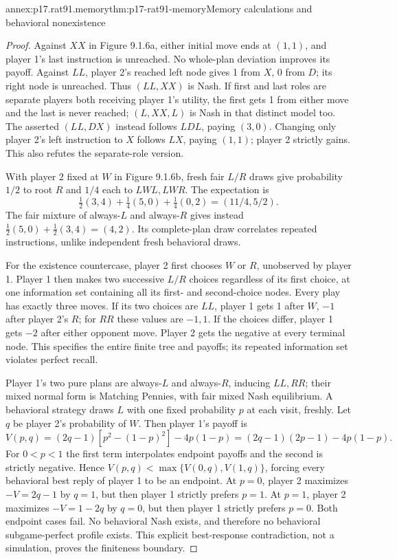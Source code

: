 \begin{annexitem}{annex:p17.rat91.memory}{thm:p17-rat91-memory}{Memory calculations and behavioral nonexistence}
\begin{proof}
Against \(XX\) in Figure 9.1.6a, either initial
move ends at \((1,1)\), and player 1's last
instruction is unreached. No whole-plan deviation
improves its payoff. Against \(LL\), player 2's
reached left node gives 1 from \(X\), 0 from
\(D\); its right node is unreached. Thus
\((LL,XX)\) is Nash. If first and last roles
are separate players both receiving player 1's
utility, the first gets 1 from either move and
the last is never reached; \((L,XX,L)\) is
Nash in that distinct model too.
The asserted \((LL,DX)\) instead follows
\(LDL\), paying \((3,0)\). Changing only
player 2's left instruction to \(X\) follows
\(LX\), paying \((1,1)\); player 2 strictly
gains. This also refutes the separate-role version.

With player 2 fixed at \(W\) in Figure 9.1.6b,
fresh fair \(L/R\) draws give probability
\(1/2\) to root \(R\) and \(1/4\) each
to \(LWL,LWR\). The expectation is
\[
 \tfrac12(3,4)+\tfrac14(5,0)+\tfrac14(0,2)
                              =(11/4,5/2).
\]
The fair mixture of always-\(L\) and always-\(R\)
gives instead \(\tfrac12(5,0)+\tfrac12(3,4)=(4,2)\).
Its complete-plan draw correlates repeated instructions,
unlike independent fresh behavioral draws.

For the existence countercase, player 2 first chooses
\(W\) or \(R\), unobserved by player 1. Player 1
then makes two successive \(L/R\) choices regardless
of its first choice, at one information set containing
all its first- and second-choice nodes. Every play has
exactly three moves. If its two choices are \(LL\),
player 1 gets 1 after \(W\), \(-1\) after player
2's \(R\); for \(RR\) these values are \(-1,1\).
If the choices differ, player 1 gets \(-2\) after
either opponent move. Player 2 gets the negative
at every terminal node. This specifies the entire
finite tree and payoffs; its repeated information
set violates perfect recall.

Player 1's two pure plans are always-\(L\) and
always-\(R\), inducing \(LL,RR\); their mixed
normal form is Matching Pennies, with fair mixed
Nash equilibrium. A behavioral strategy draws
\(L\) with one fixed probability \(p\) at each
visit, freshly. Let \(q\) be player 2's probability
of \(W\). Then player 1's payoff is
\[
 V(p,q)=(2q-1)[p^2-(1-p)^2]-4p(1-p)
       =(2q-1)(2p-1)-4p(1-p).
\]
For \(0<p<1\) the first term interpolates endpoint
payoffs and the second is strictly negative. Hence
\(V(p,q)<\max\{V(0,q),V(1,q)\}\), forcing
every behavioral best reply of player 1 to be an
endpoint. At \(p=0\), player 2 maximizes
\(-V=2q-1\) by \(q=1\), but then player 1
strictly prefers \(p=1\). At \(p=1\), player
2 maximizes \(-V=1-2q\) by \(q=0\), but
then player 1 strictly prefers \(p=0\). Both
endpoint cases fail. No behavioral Nash exists,
and therefore no behavioral subgame-perfect profile
exists. This explicit best-response contradiction,
not a simulation, proves the finiteness boundary.
\end{proof}
\end{annexitem}


